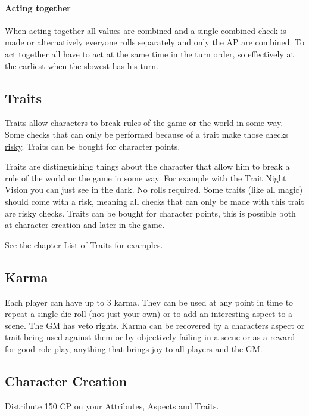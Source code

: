 \documentclass[11pt]{article}
\begin{document}
{\paragraph*{Acting together}
\label{sec:orgd01afbe}
When acting together all values are combined and a single combined check is made or alternatively everyone rolls separately and only the AP are combined. To act together all have to act at the same time in the turn order, so effectively at the earliest when the slowest has his turn.
\subsection{Traits}
\label{sec:orgb53bd20}
\begin{short}
Traits allow characters to break rules of the game or the world in some way. Some checks that can only be performed because of a trait make those checks \hyperref[sec:org46016d5]{risky}. Traits can be bought for character points.
\end{short}

Traits are distinguishing things about the character that allow him to break a rule of the world or the game in some way. For example with the Trait Night Vision you can just see in the dark. No rolls required. Some traits (like all magic) should come with a risk, meaning all checks that can only be made with this trait are risky checks. Traits can be bought for character points, this is possible both at character creation and later in the game.

See the chapter \hyperref[sec:org0e4c990]{List of Traits} for examples.
\subsection{Karma}
\label{sec:org9b8b653}
\begin{short}
Each player can have up to 3 karma. They can be used at any point in time to repeat a single die roll (not just your own) or to add an interesting aspect to a scene. The GM has veto rights. Karma can be recovered by a characters aspect or trait being used against them or by objectively failing in a scene or as a reward for good role play, anything that brings joy to all players and the GM. 
\end{short}
\subsection{Character Creation}
\label{sec:orga19567a}
\begin{short}
Distribute 150 CP on your Attributes, Aspects and Traits.


\end{short}}
\end{document}
